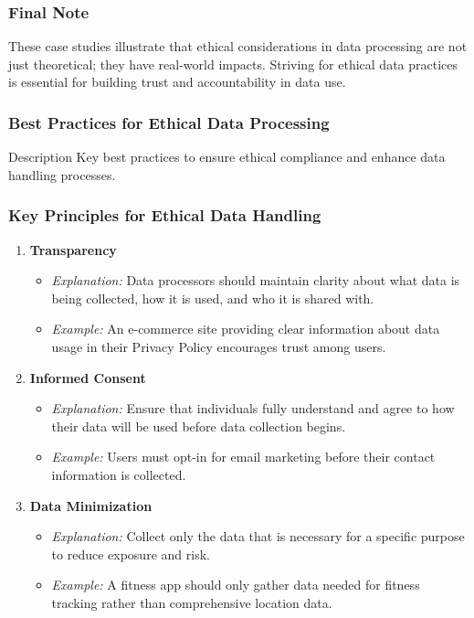 \documentclass{beamer}
\begin{document}
\begin{frame}[fragile]
    \frametitle{Final Note}
    These case studies illustrate that ethical considerations in data processing are not just theoretical; they have real-world impacts. Striving for ethical data practices is essential for building trust and accountability in data use.
\end{frame}

\begin{frame}[fragile]
    \frametitle{Best Practices for Ethical Data Processing}
    \begin{block}{Description}
        Key best practices to ensure ethical compliance and enhance data handling processes.
    \end{block}
\end{frame}

\begin{frame}[fragile]
    \frametitle{Key Principles for Ethical Data Handling}
    \begin{enumerate}
        \item \textbf{Transparency}
            \begin{itemize}
                \item \textit{Explanation:} Data processors should maintain clarity about what data is being collected, how it is used, and who it is shared with.
                \item \textit{Example:} An e-commerce site providing clear information about data usage in their Privacy Policy encourages trust among users.
            \end{itemize}
        \item \textbf{Informed Consent}
            \begin{itemize}
                \item \textit{Explanation:} Ensure that individuals fully understand and agree to how their data will be used before data collection begins.
                \item \textit{Example:} Users must opt-in for email marketing before their contact information is collected.
            \end{itemize}
        \item \textbf{Data Minimization}
            \begin{itemize}
                \item \textit{Explanation:} Collect only the data that is necessary for a specific purpose to reduce exposure and risk.
                \item \textit{Example:} A fitness app should only gather data needed for fitness tracking rather than comprehensive location data.
            \end{itemize}
    \end{enumerate}
\end{frame}
\end{document}
